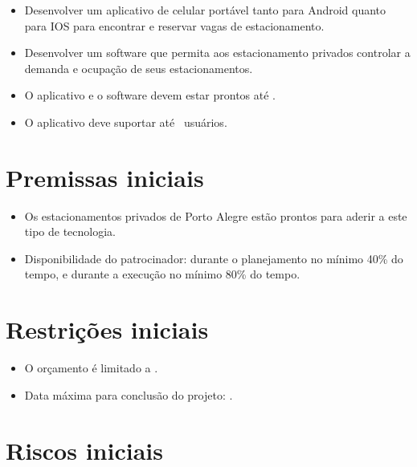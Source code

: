 
\begin{itemize}
	\item Desenvolver um aplicativo de celular portável tanto para Android quanto para IOS para encontrar e reservar vagas de estacionamento.
	\item Desenvolver um software que permita aos estacionamento privados controlar a demanda e ocupação de seus estacionamentos.
	\item O aplicativo e o software devem estar prontos até \maximumDeadline{}.
	\item O aplicativo deve suportar até \minimumUsersAmount{}\ usuários.
\end{itemize}




\section{Premissas iniciais}

\begin{itemize}
	\item Os estacionamentos privados de Porto Alegre estão prontos para aderir a este tipo de tecnologia.
	\item Disponibilidade do patrocinador: durante o planejamento no mínimo 40\% do tempo, e durante a execução no mínimo 80\% do tempo.
\end{itemize}

\section{Restrições iniciais}

\begin{itemize}
	\item O orçamento é limitado a \maximumBudget{}.
	\item Data máxima para conclusão do projeto: \maximumDeadline{}.
\end{itemize}

\section{Riscos iniciais}

